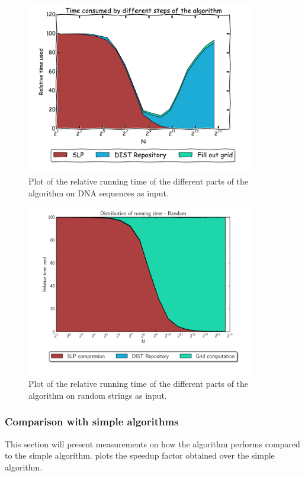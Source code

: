 \documentclass[twoside,11pt,openright]{report}
\begin{document}
\begin{figure}[h!]
  \centering
  \includegraphics[width=10cm]{combined/genome_area_plot}
  \caption{Plot of the relative running time of the different parts of the algorithm on DNA sequences as input.}
  \label{fig:benchmark:relative-runningtime-genome}
\end{figure}

\begin{figure}[h!]
  \centering
  \includegraphics[width=10cm]{combined/random_area_plot}
  \caption{Plot of the relative running time of the different parts of the algorithm on random strings as input.}
  \label{fig:benchmark:relative-runningtime-random}
\end{figure}

\subsubsection{Comparison with simple algorithms}
This section will present measurements on how the algorithm performs compared to the simple algorithm.  plots the speedup factor obtained over the simple algorithm.
\end{document}
